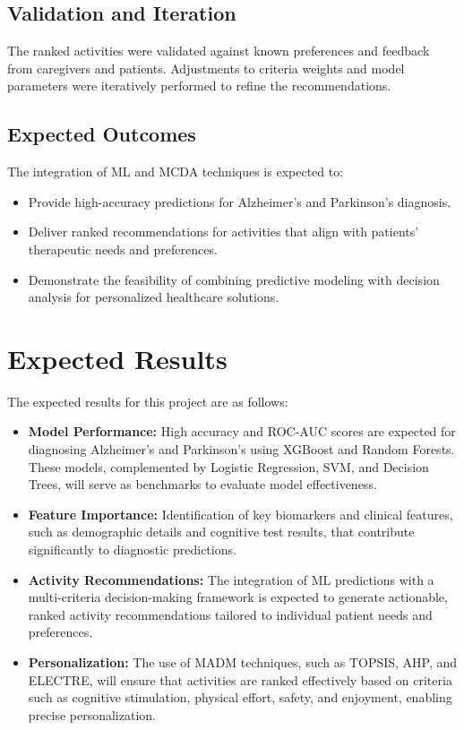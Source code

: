 \documentclass[conference]{IEEEtran}
\begin{document}
\subsection{Validation and Iteration}
The ranked activities were validated against known preferences and feedback from caregivers and patients. Adjustments to criteria weights and model parameters were iteratively performed to refine the recommendations.

\subsection{Expected Outcomes}
The integration of ML and MCDA techniques is expected to:
\begin{itemize}
    \item Provide high-accuracy predictions for Alzheimer’s and Parkinson’s diagnosis.
    \item Deliver ranked recommendations for activities that align with patients’ therapeutic needs and preferences.
    \item Demonstrate the feasibility of combining predictive modeling with decision analysis for personalized healthcare solutions.
\end{itemize}

\section{Expected Results}
The expected results for this project are as follows:

\begin{itemize}
    \item \textbf{Model Performance:} High accuracy and ROC-AUC scores are expected for diagnosing Alzheimer’s and Parkinson’s using XGBoost and Random Forests. These models, complemented by Logistic Regression, SVM, and Decision Trees, will serve as benchmarks to evaluate model effectiveness.
    \item \textbf{Feature Importance:} Identification of key biomarkers and clinical features, such as demographic details and cognitive test results, that contribute significantly to diagnostic predictions.
    \item \textbf{Activity Recommendations:} The integration of ML predictions with a multi-criteria decision-making framework is expected to generate actionable, ranked activity recommendations tailored to individual patient needs and preferences.
    \item \textbf{Personalization:} The use of MADM techniques, such as TOPSIS, AHP, and ELECTRE, will ensure that activities are ranked effectively based on criteria such as cognitive stimulation, physical effort, safety, and enjoyment, enabling precise personalization.
\end{itemize}
\end{document}
